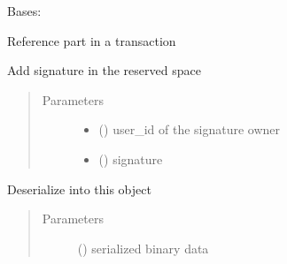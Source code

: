 \documentclass[letterpaper,10pt,english]{sphinxmanual}
\begin{document}

\begin{fulllineitems}
\label{\detokenize{bbc1.core.bbclib:bbc1.core.bbclib.BBcReference}}
Bases: 

Reference part in a transaction

\begin{fulllineitems}
\label{\detokenize{bbc1.core.bbclib:bbc1.core.bbclib.BBcReference.add_signature}}
Add signature in the reserved space
\begin{quote}\begin{description}
\item[{Parameters}] \leavevmode\begin{itemize}
\item {} 
 () \textendash{} user\_id of the signature owner

\item {} 
 () \textendash{} signature

\end{itemize}

\end{description}\end{quote}

\end{fulllineitems}


\begin{fulllineitems}
\label{\detokenize{bbc1.core.bbclib:bbc1.core.bbclib.BBcReference.deserialize}}
Deserialize into this object
\begin{quote}\begin{description}
\item[{Parameters}] \leavevmode
{} () \textendash{} serialized binary data


\end{description}
\end{quote}
\end{fulllineitems}
\end{fulllineitems}
\end{document}
